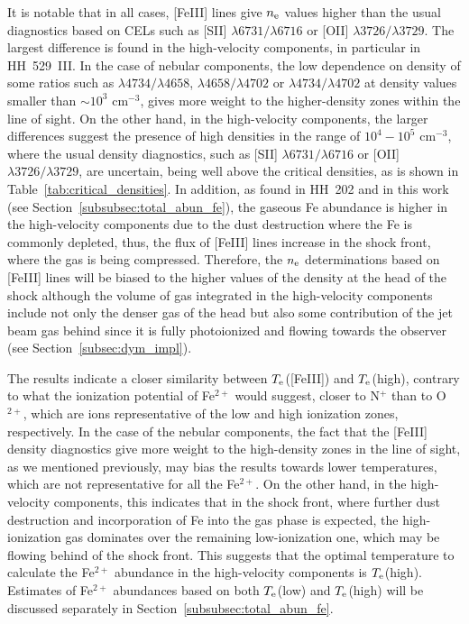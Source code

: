 \documentclass[fleqn,usenatbib]{mnras}
\begin{document}
It is notable that in all cases, [Fe\thinspace III] lines give $n_{\rm e}$ values higher than the usual diagnostics based on CELs such as [S\thinspace II] $\lambda 6731/ \lambda6716 $ or [O\thinspace II] $\lambda 3726/ \lambda3729 $. The largest difference is found in the high-velocity components, in particular in HH~529~III. In the case of nebular components, the low dependence on density of some ratios such as $\lambda 4734/\lambda 4658$, $\lambda 4658/\lambda 4702$ or $\lambda 4734/\lambda 4702$ at density values smaller than $\sim10^3$ $\text{cm}^{-3}$, gives more weight to the higher-density zones within the line of sight. On the other hand, in the high-velocity components, the larger differences suggest the presence of high densities in the range of $10^4-10^5 \text{ cm}^{-3}$, where the usual density diagnostics, such as [S\thinspace II] $\lambda 6731/ \lambda6716 $ or [O\thinspace II] $\lambda 3726/ \lambda3729 $, are uncertain, being well above the critical densities, as is shown in Table~\ref{tab:critical_densities}. In addition, as found in HH~202 \citep{mesadelgado09,espiritu17} and in this work (see Section~\ref{subsubsec:total_abun_fe}), the gaseous Fe abundance is higher in the high-velocity components due to the dust destruction where the Fe is commonly depleted, thus, the flux of [Fe\thinspace III] lines increase in the shock front, where the gas is being compressed.  Therefore, the $n_{\rm e}$ determinations based on [Fe\thinspace III] lines will be biased to the higher values of the density at the head of the shock although the volume of gas integrated in the high-velocity components include not only the denser gas of the head but also some contribution of the jet beam gas behind since it is fully photoionized and flowing towards the observer (see Section~\ref{subsec:dym_impl}).


The results indicate a closer similarity between $T_{\rm e}$([Fe\thinspace III]) and $T_{\rm e}$(high), contrary to what the ionization potential of Fe$^{2+}$ would suggest, closer to N$^+$ than to O$^{2+}$, which are ions representative of the low and high ionization zones, respectively. In the case of the nebular components, the fact that the [Fe\thinspace III] density diagnostics give more weight to the high-density zones in the line of sight, as we mentioned previously, may bias the results towards lower temperatures, which are not representative for all the Fe$^{2+}$. On the other hand, in the high-velocity components, this indicates that in the shock front, where further dust destruction and incorporation of Fe into the gas phase is expected, the high-ionization gas dominates over the remaining low-ionization one, which may be flowing behind of the shock front. This suggests that the optimal temperature to calculate the Fe$^{2+}$ abundance in the high-velocity components is $T_{\rm e}$(high). Estimates of Fe$^{2+}$ abundances based on both $T_{\rm e}$(low) and $T_{\rm e}$(high) will be discussed separately in Section~\ref{subsubsec:total_abun_fe}.
\end{document}
